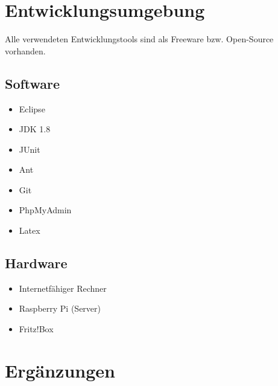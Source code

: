 \chapter {Entwicklungsumgebung}

Alle verwendeten Entwicklungstools sind als Freeware bzw. Open-Source vorhanden.

\section{Software}

\begin{itemize}
	\item Eclipse
	\item JDK 1.8
	\item JUnit
	\item Ant
	\item Git
	\item PhpMyAdmin
	\item Latex
\end{itemize}

\section{Hardware}

\begin{itemize}
	\item Internetfähiger Rechner
	\item Raspberry Pi (Server)
	\item Fritz!Box
\end{itemize}

\chapter{Ergänzungen}

